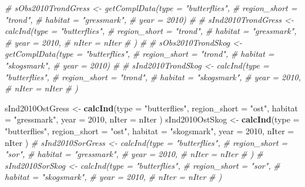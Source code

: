 \documentclass[]{article}
\newenvironment{Shaded}{\begin{snugshade}}{\end{snugshade}}
\newcommand{\KeywordTok}[1]{\textcolor[rgb]{0.13,0.29,0.53}{\textbf{#1}}}
\newcommand{\DataTypeTok}[1]{\textcolor[rgb]{0.13,0.29,0.53}{#1}}
\newcommand{\DecValTok}[1]{\textcolor[rgb]{0.00,0.00,0.81}{#1}}
\newcommand{\StringTok}[1]{\textcolor[rgb]{0.31,0.60,0.02}{#1}}
\newcommand{\CommentTok}[1]{\textcolor[rgb]{0.56,0.35,0.01}{\textit{#1}}}
\newcommand{\NormalTok}[1]{#1}
\begin{document}
\begin{Shaded}
\begin{Highlighting}[]
\CommentTok{# sObs2010TrondGress <- getComplData(type = "butterflies",}
\CommentTok{#                               region_short = "trond",}
\CommentTok{#                               habitat = "gressmark",}
\CommentTok{#                               year = 2010)}
\CommentTok{# }
\CommentTok{# sInd2010TrondGress <- calcInd(type = "butterflies",}
\CommentTok{#                               region_short = "trond",}
\CommentTok{#                               habitat = "gressmark",}
\CommentTok{#                               year = 2010,}
\CommentTok{#                               nIter = nIter}
\CommentTok{#                               )}
\CommentTok{# }
\CommentTok{# sObs2010TrondSkog <- getComplData(type = "butterflies",}
\CommentTok{#                               region_short = "trond",}
\CommentTok{#                               habitat = "skogsmark",}
\CommentTok{#                               year = 2010)}
\CommentTok{# }
\CommentTok{# sInd2010TrondSkog <- calcInd(type = "butterflies",}
\CommentTok{#                               region_short = "trond",}
\CommentTok{#                               habitat = "skogsmark",}
\CommentTok{#                               year = 2010,}
\CommentTok{#                               nIter = nIter}
\CommentTok{#                               )}

\NormalTok{sInd2010OstGress <-}\StringTok{ }\KeywordTok{calcInd}\NormalTok{(}\DataTypeTok{type =} \StringTok{"butterflies"}\NormalTok{,}
                              \DataTypeTok{region_short =} \StringTok{"ost"}\NormalTok{,}
                              \DataTypeTok{habitat =} \StringTok{"gressmark"}\NormalTok{,}
                              \DataTypeTok{year =} \DecValTok{2010}\NormalTok{,}
                              \DataTypeTok{nIter =}\NormalTok{ nIter}
\NormalTok{                              )}
\NormalTok{sInd2010OstSkog <-}\StringTok{ }\KeywordTok{calcInd}\NormalTok{(}\DataTypeTok{type =} \StringTok{"butterflies"}\NormalTok{,}
                              \DataTypeTok{region_short =} \StringTok{"ost"}\NormalTok{,}
                              \DataTypeTok{habitat =} \StringTok{"skogsmark"}\NormalTok{,}
                              \DataTypeTok{year =} \DecValTok{2010}\NormalTok{,}
                              \DataTypeTok{nIter =}\NormalTok{ nIter}
\NormalTok{                              )}
\CommentTok{# sInd2010SorGress <- calcInd(type = "butterflies",}
\CommentTok{#                               region_short = "sor",}
\CommentTok{#                               habitat = "gressmark",}
\CommentTok{#                               year = 2010,}
\CommentTok{#                               nIter = nIter}
\CommentTok{#                               )}
\CommentTok{# sInd2010SorSkog <- calcInd(type = "butterflies",}
\CommentTok{#                               region_short = "sor",}
\CommentTok{#                               habitat = "skogsmark",}
\CommentTok{#                               year = 2010,}
\CommentTok{#                               nIter = nIter}
\CommentTok{#                               )}


\end{Highlighting}
\end{Shaded}
\end{document}
